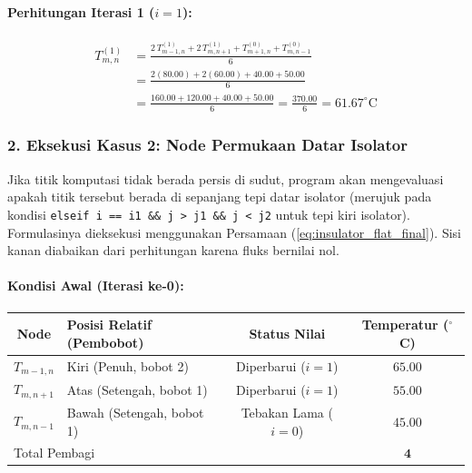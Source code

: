 \documentclass[12pt,a4paper]{article}
\begin{document}
\paragraph{Perhitungan Iterasi 1 ($i = 1$):}
\begin{align*}
T_{m,n}^{(1)}
    &= \frac{2\,T_{m-1,n}^{(1)} + 2\,T_{m,n+1}^{(1)} + T_{m+1,n}^{(0)} + T_{m,n-1}^{(0)}}{6} \\[4pt]
    &= \frac{2(80.00) + 2(60.00) + 40.00 + 50.00}{6} \\[4pt]
    &= \frac{160.00 + 120.00 + 40.00 + 50.00}{6} = \frac{370.00}{6} = \boxed{61.67^\circ\text{C}}
\end{align*}

\subsubsection*{2. Eksekusi Kasus 2: Node Permukaan Datar Isolator}
Jika titik komputasi tidak berada persis di sudut, program akan mengevaluasi apakah titik tersebut berada di sepanjang tepi datar isolator (merujuk pada kondisi \texttt{elseif i == i1 \&\& j > j1 \&\& j < j2} untuk tepi kiri isolator). Formulasinya dieksekusi menggunakan Persamaan (\ref{eq:insulator_flat_final}). Sisi kanan diabaikan dari perhitungan karena fluks bernilai nol.

\paragraph{Kondisi Awal (Iterasi ke-0):}
\begin{center}
\renewcommand{\arraystretch}{1.2}
\begin{tabular}{|c|l|c|c|}
\hline
\textbf{Node} & \textbf{Posisi Relatif (Pembobot)} & \textbf{Status Nilai} & \textbf{Temperatur ($^\circ$C)} \\
\hline
$T_{m-1,n}$ & Kiri (Penuh, bobot 2) & Diperbarui ($i=1$) & $65.00$ \\
$T_{m,n+1}$ & Atas (Setengah, bobot 1) & Diperbarui ($i=1$) & $55.00$ \\
$T_{m,n-1}$ & Bawah (Setengah, bobot 1) & Tebakan Lama ($i=0$) & $45.00$ \\
\hline
\multicolumn{3}{|l|}{Total Pembagi} & $\mathbf{4}$ \\
\hline
\end{tabular}
\end{center}
\end{document}
